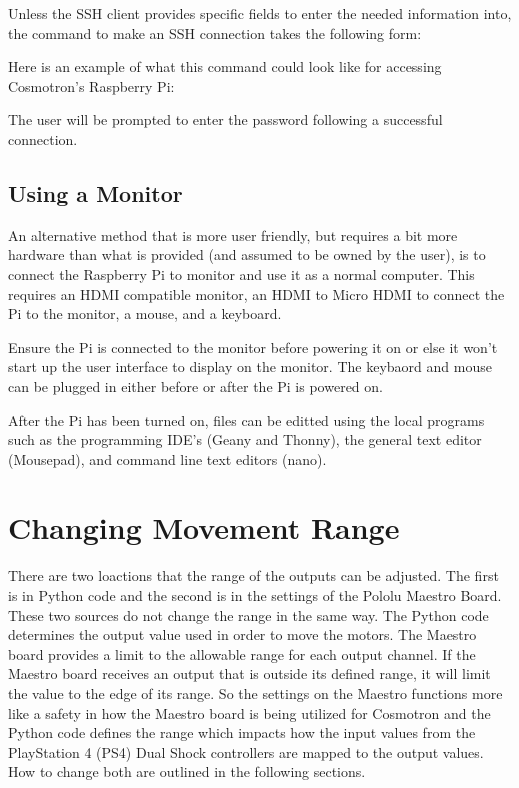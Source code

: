\documentclass[letterpaper,10pt,english]{sphinxmanual}
\begin{document}
\sphinxAtStartPar
Unless the SSH client provides specific fields to enter the needed information
into, the command to make an SSH connection takes the following form:

\sphinxAtStartPar
{}

\sphinxAtStartPar
Here is an example of what this command could look like for accessing
Cosmotron’s Raspberry Pi:

\sphinxAtStartPar
{}

\sphinxAtStartPar
The user will be prompted to enter the password following a successful connection.


\subsection{Using a Monitor}
\label{\detokenize{access:using-a-monitor}}
\sphinxAtStartPar
An alternative method that is more user friendly, but requires a bit more hardware
than what is provided (and assumed to be owned by the user), is to connect the
Raspberry Pi to monitor and use it as a normal computer. This requires an HDMI
compatible monitor, an HDMI to Micro HDMI to connect the Pi to the monitor, a mouse,
and a keyboard.

\sphinxAtStartPar
Ensure the Pi is connected to the monitor before powering it on or else it won’t
start up the user interface to display on the monitor. The keybaord and mouse can be
plugged in either before or after the Pi is powered on.

\sphinxAtStartPar
After the Pi has been turned on, files can be editted using the local programs such
as the programming IDE’s (Geany and Thonny), the general text editor (Mousepad),
and command line text editors (nano).


\section{Changing Movement Range}
\label{\detokenize{range:changing-movement-range}}\label{\detokenize{range::doc}}
\sphinxAtStartPar
There are two loactions that the range of the outputs can be adjusted. The first is
in Python code and the second is in the settings of the Pololu Maestro Board. These
two sources do not change the range in the same way. The Python code determines the
output value used in order to move the motors. The Maestro board provides a limit to
the allowable range for each output channel. If the Maestro board receives an output
that is outside its defined range, it will limit the value to the edge of its range.
So the settings on the Maestro functions more like a safety in how the Maestro board
is being utilized for Cosmotron and the Python code defines the range which impacts
how the input values from the PlayStation 4 (PS4) Dual Shock controllers are mapped
to the output values. How to change both are outlined in the following sections.
\end{document}
